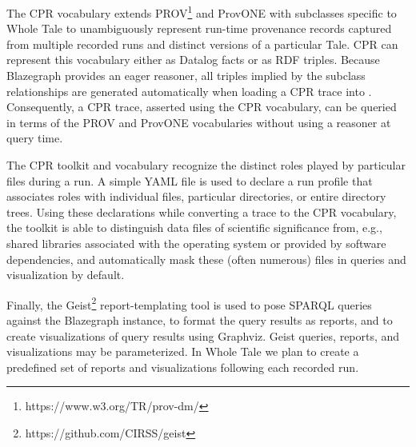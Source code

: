 The CPR vocabulary extends PROV\footnote{https://www.w3.org/TR/prov-dm/} and ProvONE \cite{provone_2015} with subclasses specific to Whole Tale to unambiguously represent run-time provenance records captured from multiple recorded runs and distinct versions of a particular Tale. CPR can represent this vocabulary either as Datalog facts or as RDF triples. Because Blazegraph provides an eager reasoner, all triples implied by the subclass relationships are generated automatically when loading a CPR trace into . Consequently, a CPR trace, asserted using the CPR vocabulary, can be queried in terms of the PROV and ProvONE vocabularies without using a reasoner at query time.

The CPR toolkit and vocabulary recognize the distinct roles played by particular files during a run. A simple YAML file is used to declare a run profile that associates roles with individual files, particular directories, or entire directory trees. Using these declarations while converting a  trace to the CPR vocabulary, the toolkit is able to distinguish data files of scientific significance from, e.g., shared libraries associated with the operating system or provided by software dependencies, and automatically mask these (often numerous) files in queries and visualization by default.

Finally, the Geist\footnote{https://github.com/CIRSS/geist} report-templating tool is used to pose SPARQL queries against the Blazegraph instance, to format the query results as reports, and to create visualizations of query results using Graphviz.  Geist queries, reports, and visualizations may be parameterized. In Whole Tale we plan to create a predefined set of reports and visualizations following each recorded run.
